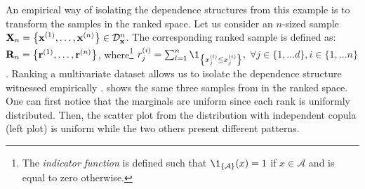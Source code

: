 An empirical way of isolating the dependence structures from this example is to transform the samples in the ranked space. 
Let us consider an $n$-sized sample ${\bf X}_n = \left\{{\bf x}^{(1)}, \dots, {\bf x}^{(n)}\right\} \in \mathcal{D}_{{\bf x}}^{n}$. 
The corresponding ranked sample is defined as: ${\bf R}_n = \left\{{\bf r}^{(1)}, \dots, {\bf r}^{(n)}\right\}$, 
where\footnote{The \textit{indicator function} is defined such that $\1_{\left\{\mathcal{A}\right\}}(x) = 1$ if $x \in \mathcal{A}$ and is equal to zero otherwise.} 
$r^{(i)}_j = \sum_{l=1}^n \1_{\left\{x^{(l)}_j \leq x^{(i)}_j\right\}},$ $\forall j \in \{1, \dots d\}, i \in \{1, \dots n\}$. 
Ranking a multivariate dataset allows us to isolate the dependence structure witnessed empirically \citep{saporta_2006}. 
 shows the same three samples from  in the ranked space. 
One can first notice that the marginals are uniform since each rank is uniformly distributed. 
Then, the scatter plot from the distribution with independent copula (left plot) is uniform while the two others present different patterns. 
